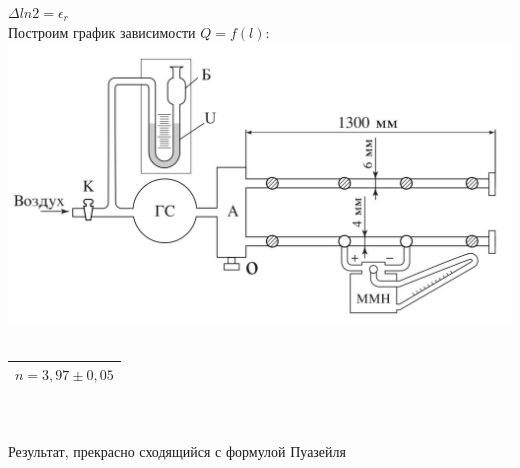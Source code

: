 \documentclass[11pt]{article}
\begin{document}
$\Delta ln2 = \epsilon_r$
\ \\
Построим график зависимости $Q = f(l)$:
\includegraphics[scale=0.55]{asd.png}
\ \\
\begin{tabular}{|c|}
\hline 
$n=3,97\pm0,05$ \\ 
\hline 
\end{tabular} 
\\
\\
Результат, прекрасно сходящийся с формулой Пуазейля 
\end{document}
